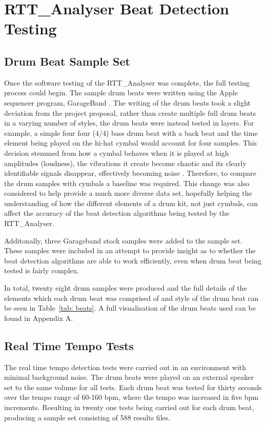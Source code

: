 \documentclass[a4paper, 11pt]{article}
\begin{document}
\maketitle{}\section{RTT\_Analyser Beat Detection Testing}
\subsection{Drum Beat Sample Set}
Once the software testing of the RTT\_Analyser was complete, the full testing process could begin. The sample drum beats were written using the Apple sequencer program, GarageBand \cite{garage}. The writing of the drum beats took a slight deviation from the project proposal, rather than create multiple full drum beats in a varying number of styles, the drum beats were instead tested in layers. For example, a simple four four (4/4) bass drum beat with a back beat and the time element being played on the hi-hat cymbal would account for four samples. This decision stemmed from how a cymbal behaves when it is played at high amplitudes (loudness), the vibrations it create become chaotic and its clearly identifiable signals disappear, effectively becoming noise \cite{soundonsound}. Therefore, to compare the drum samples with cymbals a baseline was required. This change was also considered to help provide a much more diverse data set, hopefully helping the understanding of how the different elements of a drum kit, not just cymbals, can affect the accuracy of the beat detection algorithms being tested by the RTT\_Analyser.\par

Additonally, three Garageband stock samples were added to the sample set. These samples were included in an attempt to provide insight as to whether the beat detection algorithms are able to work efficiently, even when drum beat being tested is fairly complex. 

In total, twenty eight drum samples were produced and the full details of the elements which each drum beat was comprised of and style of the drum beat can be seen in Table~\ref{tab: beats}. A full visualisation of the drum beats used can be found in Appendix A.

\subsection{Real Time Tempo Tests}
The real time tempo detection tests were carried out in an environment with minimal background noise. The drum beats were played on an external speaker set to the same volume for all tests. Each drum beat was tested for thirty seconds over the tempo range of 60-160 bpm, where the tempo was increased in five bpm increments. Resulting in twenty one tests being carried out for each drum beat, producing a sample set consisting of 588 results files.
\end{document}
